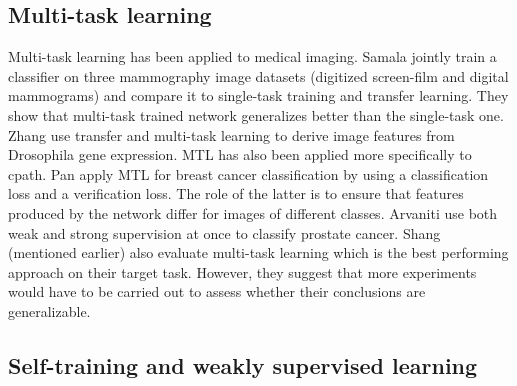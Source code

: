 \subsection{Multi-task learning}
\label{ssec:backdp:mtl}

Multi-task learning has been applied to medical imaging. Samala \etal \parencite{samala2017multi} jointly train a classifier on three mammography image datasets (digitized screen-film and digital mammograms) and compare it to single-task training and transfer learning. They show that multi-task trained network generalizes better than the single-task one. Zhang \etal \parencite{zhang2016deep} use transfer and multi-task learning to derive image features from Drosophila gene expression. MTL has also been applied more specifically to \acrlong{cpath}. Pan \etal \parencite{pan2018multi} apply MTL for breast cancer classification by using a classification loss and a verification loss. The role of the latter is to ensure that features produced by the network differ for images of different classes. Arvaniti \etal \parencite{arvaniti2018coupling} use both weak and strong supervision at once to classify prostate cancer. Shang \etal (mentioned earlier) also evaluate multi-task learning which is the best performing approach on their target task. However, they suggest that more experiments would have to be carried out to assess whether their conclusions are generalizable.

\subsection{Self-training and weakly supervised learning}
\label{ssec:backdp:st}


